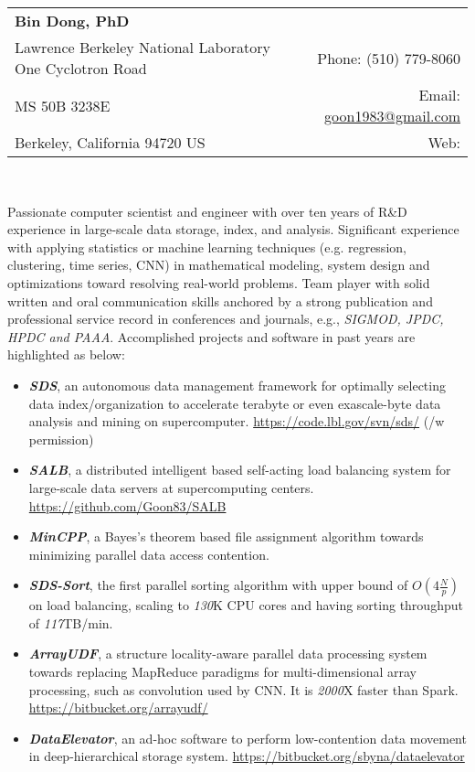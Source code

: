 \documentclass[letterpaper,11pt]{article}
\newcommand{\resheading}[1]{\vspace{8pt}
  \parbox{\textwidth}{\setlength{\FrameSep}{\fboxsep}
    \begin{shaded}
\setlength{\fboxsep}{0pt}\framebox[\textwidth][l]{\setlength{\fboxsep}{4pt}\fcolorbox{shadecolorB}{shadecolorB}{\textbf{\sffamily{\mbox{~}\makebox[6.762in][l]{\large #1} \vphantom{p\^{E}}}}}}
    \end{shaded}
  }\vspace{-5pt}
}
\newcommand{\MYhref}[3][blue]{\href{#2}{\color{#1}{#3}}}%
\begin{document}
\begin{tabular*}{7in}{l@{\extracolsep{\fill}}r}
\textbf{\Large Bin Dong, PhD} &  \\
Lawrence Berkeley National Laboratory One Cyclotron Road   & Phone: (510) 779-8060 \\
MS 50B 3238E                                               & Email: \href{mailto:goon1983@gmail.com}{goon1983@gmail.com}  \\
Berkeley, California 94720 US                              & Web: \MYhref{http://crd.lbl.gov//dongbin}{http://crd.lbl.gov//dongbin}  \\

\end{tabular*}
\\

\resheading{Profile Overview}
Passionate computer scientist and engineer with over ten years of R\&D experience in large-scale data storage, index, and analysis.  Significant experience with applying statistics or machine learning techniques (e.g. regression, clustering, time series, CNN) in mathematical modeling, system design and optimizations toward resolving real-world problems.  Team player with solid written and oral communication skills anchored by a strong publication and professional service record in conferences and journals, e.g., \textit{SIGMOD, JPDC, HPDC and PAAA}. Accomplished projects and software in past years are highlighted as below:
\begin{itemize}  
  \setlength\itemsep{0pt}
  \setlength{\leftmargini}{0pt}
\item \textbf{\textit{SDS}}, an autonomous data management framework for optimally selecting data index/organization to accelerate terabyte or even exascale-byte data analysis and mining on supercomputer. \url{https://code.lbl.gov/svn/sds/} (/w permission) 
\item \textbf{\textit{SALB}}, a distributed intelligent based self-acting load balancing system for large-scale data servers at supercomputing centers. \url{https://github.com/Goon83/SALB}
\item \textbf{\textit{MinCPP}}, a Bayes's theorem based file assignment algorithm towards minimizing parallel data access contention.
\item \textbf{\textit{SDS-Sort}}, the first parallel sorting algorithm with upper bound of $O(4\frac{N}{p})$ on load balancing, scaling to \textit{130}K CPU cores and having sorting throughput of \textit{117}TB/min. 
\item \textbf{\textit{ArrayUDF}}, a structure locality-aware parallel data processing system towards replacing MapReduce paradigms for multi-dimensional array processing, such as convolution used by CNN. It is \textit{2000}X faster than Spark. \url{https://bitbucket.org/arrayudf/}    
\item \textbf{\textit{DataElevator}}, an ad-hoc software to perform low-contention data movement in deep-hierarchical storage system. \url{ https://bitbucket.org/sbyna/dataelevator}
\end{itemize}
\end{document}
